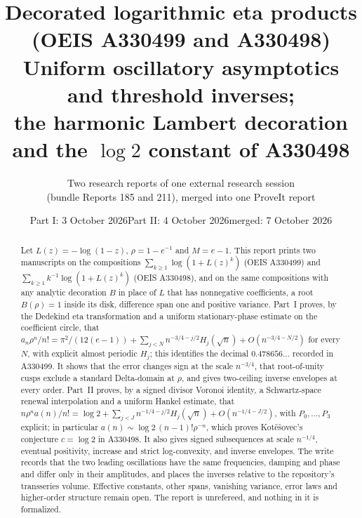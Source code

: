 \documentclass[11pt]{article}
\title{\textbf{Decorated logarithmic eta products\\ (OEIS A330499 and A330498)}\\[7pt]
\large Uniform oscillatory asymptotics and threshold inverses;\\ the harmonic Lambert decoration and the $\log2$ constant of A330498}
\author{Two research reports of one external research session\\(bundle Reports 185 and 211), merged into one ProveIt report}
\date{Part I: 3 October 2026\quad Part II: 4 October 2026\quad merged: 7 October 2026}
\theoremstyle{definition}\newtheorem{definition}[theorem]{Definition}
\theoremstyle{remark}\newtheorem{remark}[theorem]{Remark}
\begin{document}
\hypersetup{pageanchor=false}
\maketitle
\begin{abstract}
Let $L(z)=-\log(1-z)$, $\rho=1-e^{-1}$ and $M=e-1$. This report prints two manuscripts on the compositions $\sum_{k\ge1}\log(1+L(z)^k)$ (OEIS A330499) and $\sum_{k\ge1}k^{-1}\log(1+L(z)^k)$ (OEIS A330498), and on the same compositions with any analytic decoration $B$ in place of $L$ that has nonnegative coefficients, a root $B(\rho)=1$ inside its disk, difference span one and positive variance. Part~I proves, by the Dedekind eta transformation and a uniform stationary-phase estimate on the coefficient circle, that $a_n\rho^n/n!=\pi^2/(12(e-1))+\sum_{j<N}n^{-3/4-j/2}H_j(\sqrt n)+O(n^{-3/4-N/2})$ for every $N$, with explicit almost periodic $H_j$; this identifies the decimal $0.478656\ldots$ recorded in A330499. It shows that the error changes sign at the scale $n^{-3/4}$, that root-of-unity cusps exclude a standard Delta-domain at $\rho$, and gives two-ceiling inverse envelopes at every order. Part~II proves, by a signed divisor Voronoi identity, a Schwartz-space renewal interpolation and a uniform Hankel estimate, that $n\rho^na(n)/n!=\log2+\sum_{j<J}n^{-1/4-j/2}H_j(\sqrt n)+O(n^{-1/4-J/2})$, with $P_0,\dots,P_3$ explicit; in particular $a(n)\sim\log2\,(n-1)!\rho^{-n}$, which proves Kot\v{e}\v{s}ovec's conjecture $c=\log2$ in A330498. It also gives signed subsequences at scale $n^{-1/4}$, eventual positivity, increase and strict log-convexity, and inverse envelopes. The write records that the two leading oscillations have the same frequencies, damping and phase and differ only in their amplitudes, and places the inverses relative to the repository's transseries volume. Effective constants, other spans, vanishing variance, error laws and higher-order structure remain open. The report is unrefereed, and nothing in it is formalized.
\end{abstract}
\hypersetup{pageanchor=true}
{\small\setlength{\parskip}{0pt}\tableofcontents}
\newpage
\end{document}
